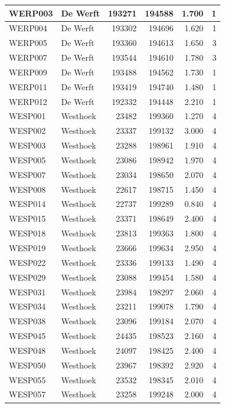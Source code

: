 \documentclass[11pt,]{book}
\begin{document}
\begin{table}
\begin{tabular}[t]{l|l|r|r|r|r}
\hline
WERP003 & De Werft & 193271 & 194588 & 1.700 & 1\\
\hline
WERP004 & De Werft & 193302 & 194696 & 1.620 & 1\\
\hline
WERP005 & De Werft & 193360 & 194613 & 1.650 & 3\\
\hline
WERP007 & De Werft & 193544 & 194610 & 1.780 & 3\\
\hline
WERP009 & De Werft & 193488 & 194562 & 1.730 & 1\\
\hline
WERP011 & De Werft & 193419 & 194740 & 1.480 & 1\\
\hline
WERP012 & De Werft & 192332 & 194448 & 2.210 & 1\\
\hline
WESP001 & Westhoek & 23482 & 199360 & 1.270 & 4\\
\hline
WESP002 & Westhoek & 23337 & 199132 & 3.000 & 4\\
\hline
WESP003 & Westhoek & 23288 & 198961 & 1.910 & 4\\
\hline
WESP005 & Westhoek & 23086 & 198942 & 1.970 & 4\\
\hline
WESP007 & Westhoek & 23034 & 198650 & 2.070 & 4\\
\hline
WESP008 & Westhoek & 22617 & 198715 & 1.450 & 4\\
\hline
WESP014 & Westhoek & 22737 & 199289 & 0.840 & 4\\
\hline
WESP015 & Westhoek & 23371 & 198649 & 2.400 & 4\\
\hline
WESP018 & Westhoek & 23813 & 199363 & 1.800 & 4\\
\hline
WESP019 & Westhoek & 23666 & 199634 & 2.950 & 4\\
\hline
WESP022 & Westhoek & 23336 & 199133 & 1.490 & 4\\
\hline
WESP029 & Westhoek & 23088 & 199454 & 1.580 & 4\\
\hline
WESP031 & Westhoek & 23984 & 198297 & 2.060 & 4\\
\hline
WESP034 & Westhoek & 23211 & 199078 & 1.790 & 4\\
\hline
WESP038 & Westhoek & 23096 & 199184 & 2.070 & 4\\
\hline
WESP045 & Westhoek & 24435 & 198523 & 2.160 & 4\\
\hline
WESP048 & Westhoek & 24097 & 198425 & 2.400 & 4\\
\hline
WESP050 & Westhoek & 23967 & 198392 & 2.920 & 4\\
\hline
WESP055 & Westhoek & 23532 & 198345 & 2.010 & 4\\
\hline
WESP057 & Westhoek & 23258 & 199248 & 2.000 & 4\\

\end{tabular}
\end{table}
\end{document}
